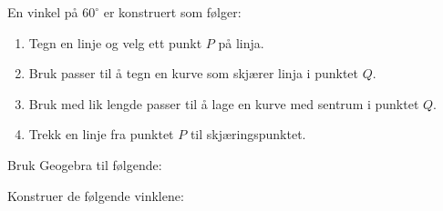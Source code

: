 \documentclass[12pt]{exam}
\begin{document}
\begin{questions}
\question
En vinkel på $60^{\circ}$ er konstruert som følger:
\begin{enumerate}
\item Tegn en linje og velg ett punkt $P$ på linja.
\item Bruk passer til å tegn en kurve som skjærer linja i punktet $Q$.
\item Bruk med lik lengde passer til å lage en kurve med sentrum i punktet $Q$.
\item Trekk en linje fra punktet $P$ til skjæringspunktet.
\end{enumerate}
Bruk Geogebra til følgende:

\question
 Konstruer de følgende vinklene:
\end{questions}
\end{document}

